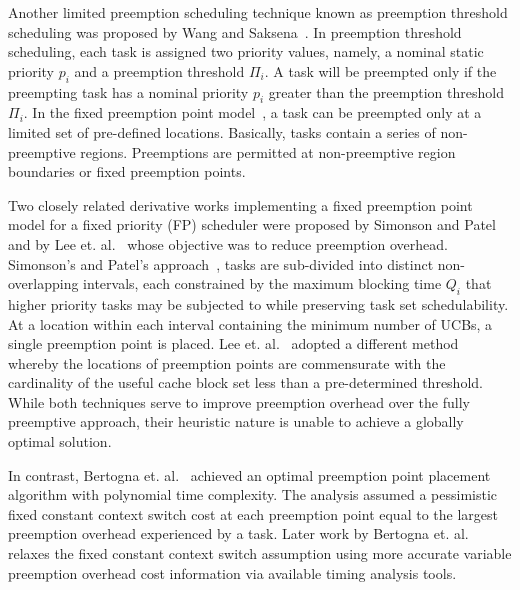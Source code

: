 Another limited preemption scheduling technique known as preemption threshold scheduling was proposed by Wang and Saksena~\cite{wang:99}.  In preemption threshold scheduling, each task is assigned two priority values, namely, a nominal static priority \begin{math}p_{i}\end{math} and a preemption threshold \begin{math}\Pi_{i}\end{math}.  A task will be preempted only if the preempting task has a nominal priority \begin{math}p_{i}\end{math} greater than the preemption threshold \begin{math}\Pi_{i}\end{math}. In the fixed preemption point model~\cite{burns:05}, a task can be preempted only at a limited set of pre-defined locations. Basically, tasks contain a series of non-preemptive regions.  Preemptions are permitted at non-preemptive region boundaries or fixed preemption points.

Two closely related derivative works implementing a fixed preemption point model for a fixed priority (FP) scheduler were proposed by Simonson and Patel~\cite{simonson:95} and by Lee et. al.~\cite{lee:98} whose objective was to reduce preemption overhead.  Simonson’s and Patel’s approach~\cite{simonson:95}, tasks are sub-divided into distinct non-overlapping intervals, each constrained by the maximum blocking time \begin{math}Q_{i}\end{math} that higher priority tasks may be subjected to while preserving task set schedulability.  At a location within each interval containing the minimum number of UCBs, a single preemption point is placed.  Lee et. al.~\cite{lee:98} adopted a different method whereby the locations of preemption points are commensurate with the cardinality of the useful cache block set less than a pre-determined threshold.   While both techniques serve to improve preemption overhead over the fully preemptive approach, their heuristic nature is unable to achieve a globally optimal solution.

In contrast, Bertogna et. al.~\cite{bertogna:10} achieved an optimal preemption point placement algorithm with polynomial time complexity.  The analysis assumed a pessimistic fixed constant context switch cost at each preemption point equal to the largest preemption overhead experienced by a task.  Later work by Bertogna et. al.~\cite{bertogna:11} relaxes the fixed constant context switch assumption using more accurate variable preemption overhead cost information via available timing analysis tools.

